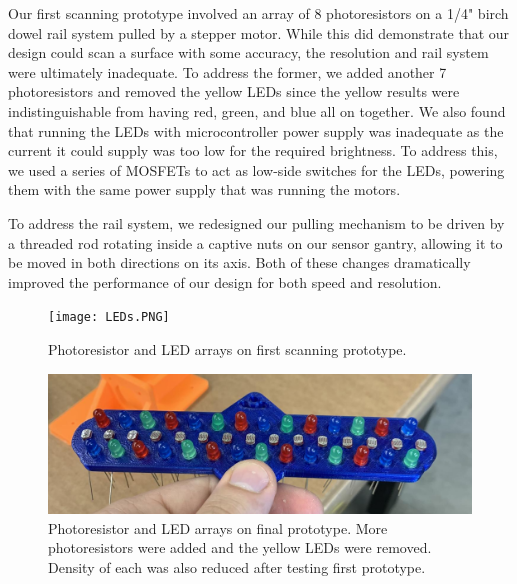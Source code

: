 \documentclass[12pt]{article}
\begin{document}
\begin{multicols*}{2}
            Our first scanning prototype involved an array of 8 photoresistors on a 1/4" birch dowel rail system pulled by a stepper motor. While this did demonstrate that our design could scan a surface with some accuracy, the resolution and rail system were ultimately inadequate. To address the former, we added another 7 photoresistors and removed the yellow LEDs since the yellow results were indistinguishable from having red, green, and blue all on together. We also found that running the LEDs with microcontroller power supply was inadequate as the current it could supply was too low for the required brightness. To address this, we used a series of MOSFETs to act as low-side switches for the LEDs, powering them with the same power supply that was running the motors.
            
            To address the rail system, we redesigned our pulling mechanism to be driven by a threaded rod rotating inside a captive nuts on our sensor gantry, allowing it to be moved in both directions on its axis. Both of these changes dramatically improved the performance of our design for both speed and resolution.

            \begin{figure}[H]
                \centering\texttt{[image: LEDs.PNG]}
                \captionsetup{width=\linewidth}
                \caption{Photoresistor and LED arrays on first scanning prototype.}
                \label{fig:LEDs}
            \end{figure}

            \begin{figure}[H]
                \centering\includegraphics[width=\linewidth]{ScannerV2.png}
                \captionsetup{width=\linewidth}
                \caption{Photoresistor and LED arrays on final prototype. More photoresistors were added and the yellow LEDs were removed. Density of each was also reduced after testing first prototype.}
                \label{fig:LED0sV2}
            \end{figure}


\end{multicols*}
\end{document}
